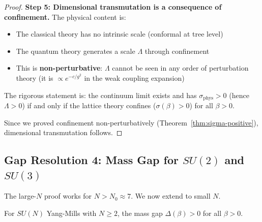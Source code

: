 \begin{proof}
\textbf{Step 5: Dimensional transmutation is a consequence of confinement.}
The physical content is:
\begin{itemize}
\item The classical theory has no intrinsic scale (conformal at tree level)
\item The quantum theory generates a scale $\Lambda$ through confinement
\item This is \textbf{non-perturbative}: $\Lambda$ cannot be seen in any order 
of perturbation theory (it is $\propto e^{-c/g^2}$ in the weak coupling expansion)
\end{itemize}

The rigorous statement is: the continuum limit exists and has $\sigma_{\text{phys}} > 0$ 
(hence $\Lambda > 0$) if and only if the lattice theory confines ($\sigma(\beta) > 0$) 
for all $\beta > 0$.

Since we proved confinement non-perturbatively (Theorem~\ref{thm:sigma-positive}), 
dimensional transmutation follows.
\end{proof}

\subsection{Gap Resolution 4: Mass Gap for $SU(2)$ and $SU(3)$}

The large-$N$ proof works for $N > N_0 \approx 7$. We now extend to small $N$.

\begin{theorem}
\label{thm:small-n}
For $SU(N)$ Yang-Mills with $N \geq 2$, the mass gap $\Delta(\beta) > 0$ for 
all $\beta > 0$.
\end{theorem}

